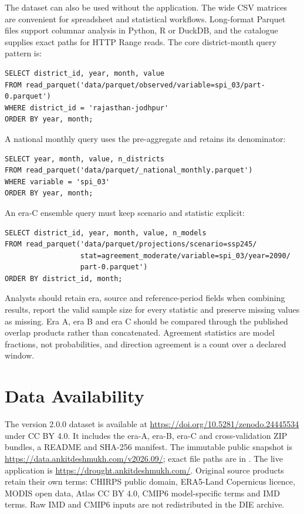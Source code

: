 \documentclass[11pt,a4paper]{article}
\begin{document}
The dataset can also be used without the application. The wide CSV matrices are convenient for spreadsheet and statistical workflows. Long-format Parquet files support columnar analysis in Python, R or DuckDB, and the catalogue supplies exact paths for HTTP Range reads. The core district-month query pattern is:

\begin{verbatim}
SELECT district_id, year, month, value
FROM read_parquet('data/parquet/observed/variable=spi_03/part-0.parquet')
WHERE district_id = 'rajasthan-jodhpur'
ORDER BY year, month;
\end{verbatim}

A national monthly query uses the pre-aggregate and retains its denominator:

\begin{verbatim}
SELECT year, month, value, n_districts
FROM read_parquet('data/parquet/_national_monthly.parquet')
WHERE variable = 'spi_03'
ORDER BY year, month;
\end{verbatim}

An era-C ensemble query must keep scenario and statistic explicit:

\begin{verbatim}
SELECT district_id, year, month, value, n_models
FROM read_parquet('data/parquet/projections/scenario=ssp245/
                  stat=agreement_moderate/variable=spi_03/year=2090/
                  part-0.parquet')
ORDER BY district_id, month;
\end{verbatim}

Analysts should retain era, source and reference-period fields when combining results, report the valid sample size for every statistic and preserve missing values as missing. Era A, era B and era C should be compared through the published overlap products rather than concatenated. Agreement statistics are model fractions, not probabilities, and direction agreement is a count over a declared window.

\section*{Data Availability}
The version 2.0.0 dataset is available at \url{https://doi.org/10.5281/zenodo.24445534}\citep{DeshmukhData2026} under CC BY 4.0. It includes the era-A, era-B, era-C and cross-validation ZIP bundles, a README and SHA-256 manifest. The immutable public snapshot is \url{https://data.ankitdeshmukh.com/v2026.09/}; exact file paths are in . The live application is \url{https://drought.ankitdeshmukh.com/}. Original source products retain their own terms: CHIRPS public domain, ERA5-Land Copernicus licence, MODIS open data, Atlas CC BY 4.0, CMIP6 model-specific terms and IMD terms. Raw IMD and CMIP6 inputs are not redistributed in the DIE archive.
\end{document}

